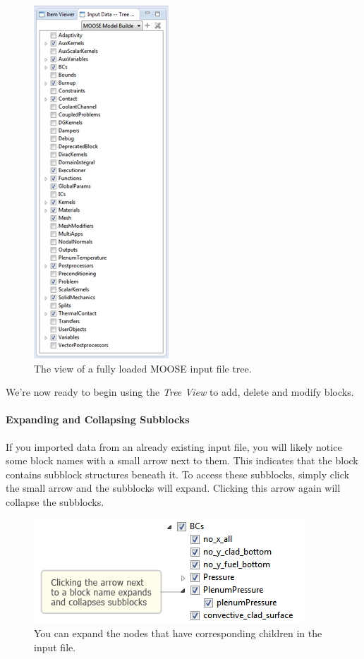 \begin{figure}[htbp]
\centering
\includegraphics[scale=.9]{figures/ICE_LoadedMOOSETree.png}
\caption{The view of a fully loaded MOOSE input file tree.}
\end{figure}

We're now ready to begin using the \emph{Tree View} to add, delete and
modify blocks.

\paragraph{Expanding and Collapsing
Subblocks}\label{expanding-and-collapsing-subblocks}

If you imported data from an already existing input file, you will
likely notice some block names with a small arrow next to them. This
indicates that the block contains subblock structures beneath it. To
access these subblocks, simply click the small arrow and the subblocks
will expand. Clicking this arrow again will collapse the subblocks.

\begin{figure}[htbp]
\centering
\includegraphics[scale=.8]{figures/ICE_MOOSEBlockExpand.png}
\caption{You can expand the nodes that have corresponding children in the input file.}
\end{figure}

